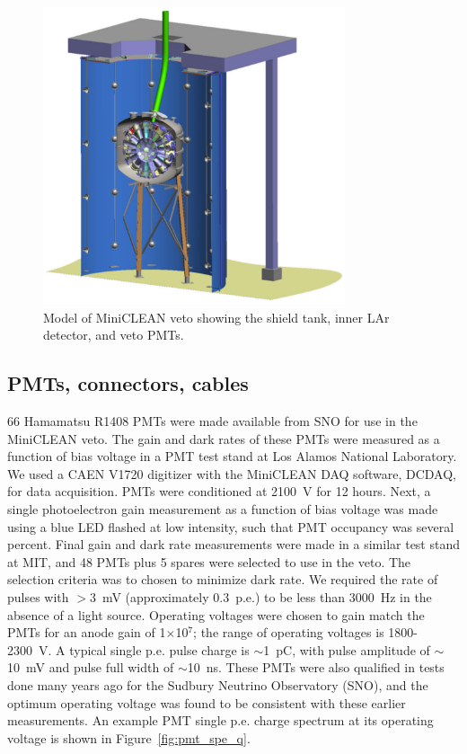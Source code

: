 \documentclass{JINST}
\begin{document}
\begin{figure}[ht]
\begin{center}
\includegraphics[width=3.5in]{graphics/miniclean_overview_drawing.pdf}
\caption{Model of MiniCLEAN veto showing the shield tank, inner LAr detector, and veto PMTs.
\label{fig:veto_geom}}
\end{center}
\end{figure}

\subsection{PMTs, connectors, cables}
\label{sec:pmts}
%
66 Hamamatsu R1408 PMTs were made available from SNO for use in the MiniCLEAN
veto. The gain and dark rates of these PMTs were measured as a
function of bias voltage in a PMT test stand at Los Alamos National
Laboratory.  We used a CAEN V1720 digitizer with the MiniCLEAN DAQ
software, DCDAQ, for data acquisition. PMTs were conditioned at 2100~V
for 12 hours. Next, a single photoelectron gain measurement as a
function of bias voltage was made using a blue LED flashed at low
intensity, such that PMT occupancy was several percent. Final gain and
dark rate measurements were made in a similar test stand at MIT, and
48 PMTs plus 5 spares were selected to use in the veto.  The selection
criteria was to chosen to minimize dark rate.  We required the rate of pulses with
$>$3~mV (approximately 0.3~p.e.) to be less than 3000~Hz in the
absence of a light source.  Operating voltages were chosen to gain
match the PMTs for an anode gain of 1$\times$10$^7$; the range of
operating voltages is 1800-2300~V.  A typical single p.e. pulse charge
is $\sim$1~pC, with pulse amplitude of $\sim$10~mV and pulse full width of
$\sim$10~ns.  These PMTs were also qualified in tests done many years ago for
the Sudbury Neutrino Observatory (SNO), and the optimum operating voltage was
found to be consistent with these earlier measurements.
An example PMT single p.e. charge spectrum at its operating voltage is
shown in Figure~\ref{fig:pmt_spe_q}.
\end{document}
